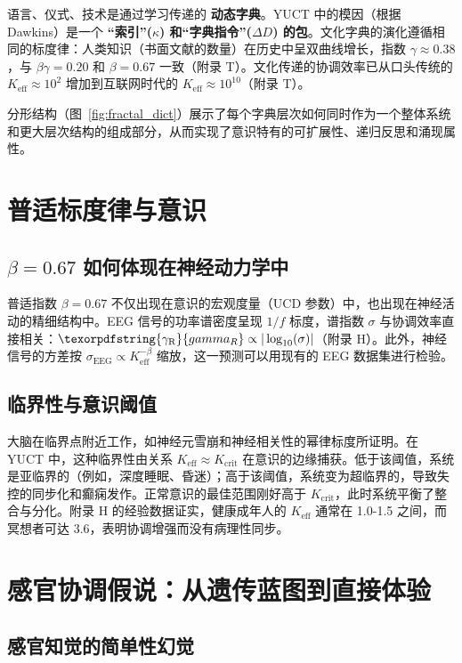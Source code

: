 \documentclass[12pt,a4paper]{article}
\DeclareRobustCommand{\gaR}{\texorpdfstring{\ensuremath{\gamma_{\mathrm{R}}}}{gamma_R}}
\newcommand{\eff}{\mathrm{eff}}
\newcommand{\Ke}{K_{\eff}}
\newcommand{\Kcrit}{K_{\mathrm{crit}}}
\begin{document}
	语言、仪式、技术是通过学习传递的 \textbf{动态字典}。YUCT 中的模因（根据 Dawkins）是一个 \textbf{“索引”($\kappa$) 和“字典指令”($\Delta D$) 的包}。文化字典的演化遵循相同的标度律：人类知识（书面文献的数量）在历史中呈双曲线增长，指数 $\gamma \approx 0.38$，与 $\beta\gamma = 0.20$ 和 $\beta = 0.67$ 一致（附录 T）。文化传递的协调效率已从口头传统的 $\Ke \approx 10^2$ 增加到互联网时代的 $\Ke \approx 10^{10}$（附录 T）。
	
	分形结构（图~\ref{fig:fractal_dict}）展示了每个字典层次如何同时作为一个整体系统和更大层次结构的组成部分，从而实现了意识特有的可扩展性、递归反思和涌现属性。
	
	\section{普适标度律与意识}
	
	\subsection{$\beta = 0.67$ 如何体现在神经动力学中}
	
	普适指数 $\beta = 0.67$ 不仅出现在意识的宏观度量（UCD 参数）中，也出现在神经活动的精细结构中。EEG 信号的功率谱密度呈现 $1/f$ 标度，谱指数 $\sigma$ 与协调效率直接相关：$\gaR \propto |\log_{10}(\sigma)|$（附录 H）。此外，神经信号的方差按 $\sigma_{\text{EEG}} \propto \Ke^{-\beta}$ 缩放，这一预测可以用现有的 EEG 数据集进行检验。
	
	\subsection{临界性与意识阈值}
	
	大脑在临界点附近工作，如神经元雪崩和神经相关性的幂律标度所证明。在 YUCT 中，这种临界性由关系 $\Ke \approx \Kcrit$ 在意识的边缘捕获。低于该阈值，系统是亚临界的（例如，深度睡眠、昏迷）；高于该阈值，系统变为超临界的，导致失控的同步化和癫痫发作。正常意识的最佳范围刚好高于 $\Kcrit$，此时系统平衡了整合与分化。附录 H 的经验数据证实，健康成年人的 $\Ke$ 通常在 1.0-1.5 之间，而冥想者可达 3.6，表明协调增强而没有病理性同步。
	
	\section{感官协调假说：从遗传蓝图到直接体验}
	
	\subsection{感官知觉的简单性幻觉}
	
\end{document}
